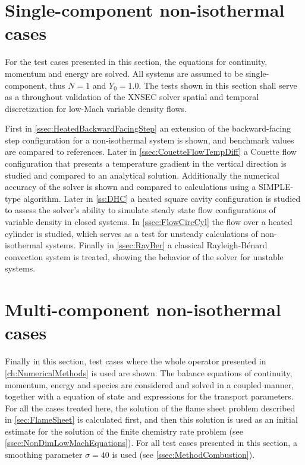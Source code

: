 \section{Single-component non-isothermal cases} \label{sec:SinCompNonIsothermCase}
For the test cases presented in this section, the equations for continuity, momentum and energy are solved. All systems are assumed to be single-component, thus $N = 1$ and $Y_0 = 1.0$. 
The tests shown in this section shall serve as a throughout validation of the XNSEC solver spatial and temporal discretization for low-Mach variable density flows. 

First in \cref{ssec:HeatedBackwardFacingStep} an extension of the backward-facing step configuration for a non-isothermal system is shown, and benchmark values are compared to references. Later in \cref{ssec:CouetteFlowTempDiff} a Couette flow configuration that presents a temperature gradient in the vertical direction is studied and compared to an analytical solution. Additionally the numerical accuracy of the solver is shown and compared to calculations using a SIMPLE-type algorithm. Later in \cref{ss:DHC} a heated square cavity configuration is studied to assess the solver's ability to simulate steady state flow configurations of variable density in closed systems. In \cref{ssec:FlowCircCyl} the flow over a heated cylinder is studied, which serves as a test for unsteady calculations of non-isothermal systems. Finally in \cref{ssec:RayBer} a classical Rayleigh-Bénard convection system is treated, showing the behavior of the solver for unstable systems.





\section{Multi-component non-isothermal cases}\label{sec:MultCompNonIsothermCase}
Finally in this section, test cases where the whole operator presented in \cref{ch:NumericalMethods} is used are shown. The balance equations of continuity, momentum, energy and species are considered and solved in a coupled manner, together with a equation of state and expressions for the transport parameters. For all the cases treated here, the solution of the flame sheet problem described in \cref{sec:FlameSheet} is calculated first, and then this solution is used as an initial estimate for the solution of the finite chemistry rate problem (see \cref{ssec:NonDimLowMachEquations}). For all test cases presented in this section, a smoothing parameter $\sigma = 40$ is used (see \cref{ssec:MethodCombustion}). 

